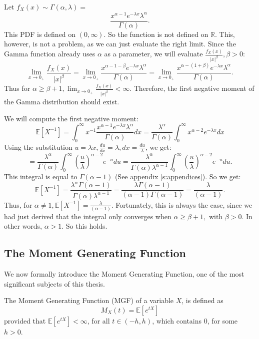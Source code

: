 \begin{example}\label{e: negative}
    Let \(f_X(x) \sim \Gamma(\alpha, \lambda) =\) 
    \[\frac{x^{\alpha -1} e^{-\lambda x} \lambda^\alpha} {\Gamma(\alpha)}.\] This PDF is defined on \((0, \infty)\). So the function is not defined on \(\mathbb{R}\). This, however, is not a problem, as we can just evaluate the right limit. Since the Gamma function already uses \(\alpha\) as a parameter, we will evaluate \(\frac{f_X(x)}{|x|^\beta}, \beta > 0\):
    \[\lim_{x \to 0_+} \frac{f_X(x)}{|x|^\beta} = \lim_{x \to 0_+} \frac{x^{\alpha -1 - \beta} e^{-\lambda x} \lambda^\alpha} {\Gamma(\alpha)} = \lim_{x \to 0_+} \frac{x^{\alpha -(1 + \beta)} e^{-\lambda x} \lambda^\alpha} {\Gamma(\alpha)} .\] Thus for \(\alpha \geq \beta + 1, \lim_{x \to 0_+} \frac{f_X(x)}{|x|^\beta} < \infty\). Therefore, the first negative moment of the Gamma distribution should exist.

    We will compute the first negative moment: 
    \[ \mathbb{E}[X^{-1}] = \int_{0}^{\infty} x^{-1} \frac{x^{\alpha -1} e^{-\lambda x} \lambda^\alpha} {\Gamma(\alpha)} dx = \frac{\lambda^\alpha}{\Gamma(\alpha)} \int_{0}^{\infty} x^{\alpha - 2} e^{-\lambda x} dx\]
    Using the substitution \( u = \lambda x, \frac{du}{dx} = \lambda, dx = \frac{du}{\lambda}\), we get:
    \[ = \frac{\lambda^\alpha}{\Gamma(\alpha)} \int_{0}^{\infty}\left(\frac{u}{\lambda}\right)^{\alpha -2} e^{-u} du = \frac{\lambda^\alpha}{\Gamma(\alpha) \lambda^{\alpha-1}} \int_{0}^{\infty}(\frac{u}{\lambda})^{\alpha -2} e^{-u} du.\] This integral is equal to \(\Gamma(\alpha - 1)\) (See appendix \ref{s:appendices}). So we get: 
    \[\mathbb{E}[X^{-1}] = \frac{\lambda^\alpha \Gamma(\alpha - 1) }{\Gamma(\alpha) \lambda^{\alpha-1}} = \frac{\lambda \Gamma(\alpha - 1)}{(\alpha -1)\Gamma(\alpha - 1)} = \frac{\lambda}{(\alpha -1)}.\] Thus, for \(\alpha \neq 1, \mathbb{E}[X^{-1}] = \frac{\lambda}{(\alpha -1)}\). Fortunately, this is always the case, since we had just derived that the integral only converges when \(\alpha \geq \beta + 1, \text{ with } \beta > 0\). In other words, \(\alpha > 1\). So this holds.
\end{example}
\subsection{The Moment Generating Function}
We now formally introduce the Moment Generating Function, one of the most significant subjects of this thesis.
\begin{definition}
    The Moment Generating Function (MGF) of a variable \(X\), is defined as
    \[M_X(t) = \mathbb{E}[e^{tX}]\] provided that \(\mathbb{E}[e^{tX}] < \infty\), for all  \( t \in (- h, h)\), which contains 0, for some \(h > 0\).
\end{definition}

